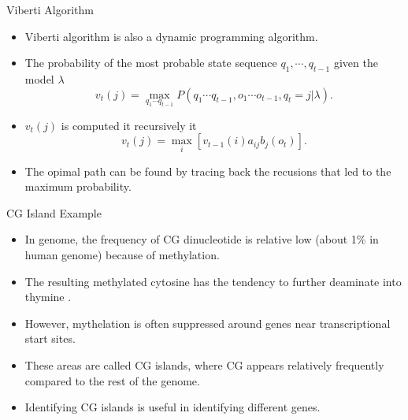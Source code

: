 \documentclass{beamer}
\begin{document}
\begin{frame}{Viberti Algorithm}
	\begin{itemize}
		\item Viberti algorithm is also a dynamic programming algorithm.
		\item The probability of the most probable state sequence $q_1, \cdots, q_{t-1}$ given the model $\lambda$
		\begin{equation}
			v_t(j) = \max_{q_1\cdots q_{t-1}} P(q_1\cdots q_{t-1}, o_1\cdots o_{t-1}, q_t = j \vert \lambda).
		\end{equation}
		\item $v_t(j)$ is computed it recursively it 
		\begin{equation}
			v_t(j) = \max_i[v_{t-1}(i) a_{ij} b_j(o_t)].
		\end{equation}
		\item The opimal path can be found by tracing back the recusions that led to the maximum probability.
	\end{itemize}
\end{frame}


\begin{frame}{CG Island Example}
	\begin{itemize}
		\item In genome, the frequency of CG dinucleotide is relative low (about 1\% in human genome) because of methylation. 
		\item The resulting methylated cytosine has the tendency to further deaminate into thymine \cite{compeau2018bioinformatics}.
		\item However, mythelation is often suppressed around genes near transcriptional start sites.
		\item These areas are called CG islands, where CG appears relatively frequently compared to the rest of the genome.
		\item Identifying CG islands is useful in identifying different genes.
	\end{itemize}
\end{frame}
\end{document}
